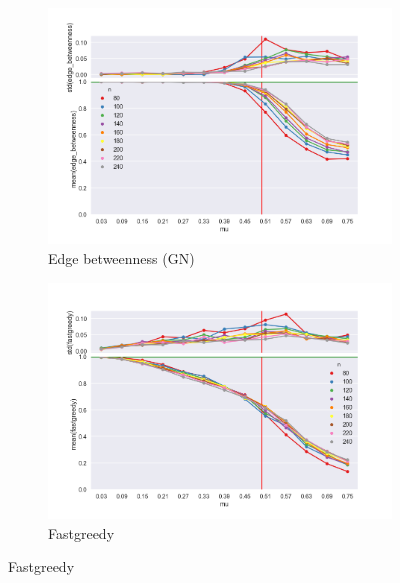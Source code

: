 \begin{figure}
    \begin{subfigure}[b]{0.32\textwidth}
        \includegraphics[width=\textwidth]{fig/nmi_vs_mu_edge_betweenness}
        \caption{Edge betweenness (GN)}
        \label{fig:gull}
    \end{subfigure}
    \qquad%
    \begin{subfigure}[b]{0.32\textwidth}
        \includegraphics[width=\textwidth]{fig/nmi_vs_mu_fastgreedy}
        \caption{Fastgreedy}
        \label{fig:tiger}
    \end{subfigure}
    

\end{figure}
